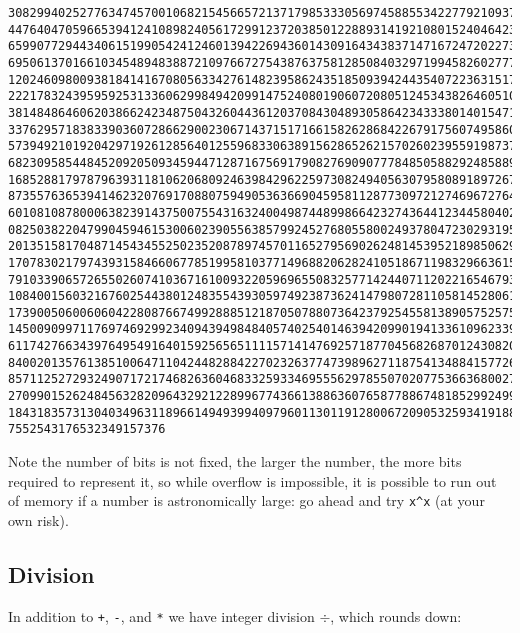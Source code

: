 \documentclass[12pt,a4paper]{article}
\begin{document}
\begin{lstlisting}
308299402527763474570010682154566572137179853330569745885534227792109373198
447640470596653941241089824056172991237203850122889314192108015240464239377
659907729443406151990542412460139422694360143091643438371471672472022733159
695061370166103454894838872109766727543876375812850840329719945826027770730
120246098009381841416708056334276148239586243518509394244354072236315177002
222178324395959253133606299849420991475240801906072080512453438264605109361
381484864606203866242348750432604436120370843048930586423433380140154714002
337629571838339036072866290023067143715171661582628684226791756074958601816
573949210192042971926128564012559683306389156286526215702602395591987379284
682309585448452092050934594471287167569179082769090777848505882924858894568
168528817978796393118106206809246398429622597308249405630795808918972670167
873557636539414623207691708807594905363669045958112877309721274696727649649
601081087800063823914375007554316324004987448998664232743644123445804025448
082503822047990459461530060239055638579924527680558002493780472302931956594
201351581704871454345525023520878974570116527956902624814539521898506299183
170783021797439315846606778519958103771496882062824105186711983296636153004
791033906572655026074103671610093220596965508325771424407112022165467934046
108400156032167602544380124835543930597492387362414798072811058145280610901
173900506006060422808766749928885121870507880736423792545581389057525756998
145009099711769746929923409439498484057402540146394209901941336109623390905
611742766343976495491640159256565111157141476925718770456826870124308204483
840020135761385100647110424482884227023263774739896271187541348841577264708
857112527293249071721746826360468332593346955562978550702077536636800275361
270990152624845632820964329212289967743661388636076587788674818529924999492
184318357313040349631189661494939940979601130119128006720905325934191881396
7552543176532349157376
\end{lstlisting}


Note the number of bits is not fixed, the larger the number, the more bits required to represent it, so while overflow is impossible, it is possible to run out of memory if a number is astronomically large: go ahead and try \texttt{x\^{}x} (at your own risk).

\subsection{Division}
In addition to \texttt{+}, \texttt{-}, and \texttt{*} we have integer division \texttt{\ensuremath{\div}}, which rounds down:
\end{document}
